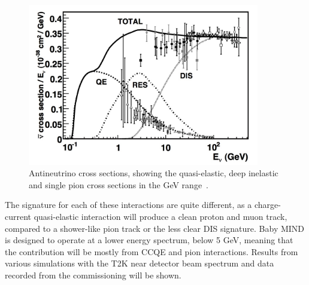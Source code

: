 \begin{figure}[h!]
\centering
\includegraphics[width=0.9\textwidth]{figures/antineutrinototal.jpeg}
\caption{Antineutrino cross sections, showing the quasi-elastic, deep inelastic and single pion cross sections in the GeV range~\cite{109Formaggio}.}
\label{fig:antineutrinoInteractionsFig}
\end{figure}

The signature for each of these interactions are quite different, as a charge-current quasi-elastic interaction will produce a clean proton and muon track, compared to a shower-like pion track or the less clear DIS signature. Baby MIND is designed to operate at a lower energy spectrum, below 5 GeV, meaning that the contribution will be mostly from CCQE and pion interactions. Results from various simulations with the T2K near detector beam spectrum and data recorded from the commissioning will be shown.


